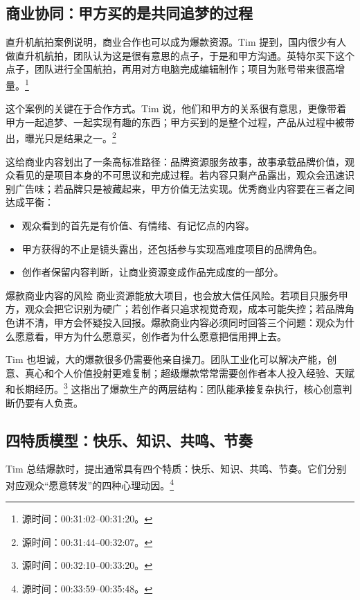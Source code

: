 \documentclass[a4paper]{article}
\begin{document}
\subsection{商业协同：甲方买的是共同追梦的过程}

直升机航拍案例说明，商业合作也可以成为爆款资源。Tim 提到，国内很少有人做直升机航拍，团队认为这是很有意思的点子，于是和甲方沟通。英特尔买下这个点子，团队进行全国航拍，再用对方电脑完成编辑制作；项目为账号带来很高增量。\footnote{源时间：00:31:02--00:31:20。}

这个案例的关键在于合作方式。Tim 说，他们和甲方的关系很有意思，更像带着甲方一起追梦、一起实现有趣的东西；甲方买到的是整个过程，产品从过程中被带出，曝光只是结果之一。\footnote{源时间：00:31:44--00:32:07。}

这给商业内容划出了一条高标准路径：品牌资源服务故事，故事承载品牌价值，观众看见的是项目本身的不可思议和完成过程。若内容只剩产品露出，观众会迅速识别广告味；若品牌只是被藏起来，甲方价值无法实现。优秀商业内容要在三者之间达成平衡：

\begin{itemize}
  \item 观众看到的首先是有价值、有情绪、有记忆点的内容。
  \item 甲方获得的不止是镜头露出，还包括参与实现高难度项目的品牌角色。
  \item 创作者保留内容判断，让商业资源变成作品完成度的一部分。
\end{itemize}

\begin{warningbox}{爆款商业内容的风险}
商业资源能放大项目，也会放大信任风险。若项目只服务甲方，观众会把它识别为硬广；若创作者只追求视觉奇观，成本可能失控；若品牌角色讲不清，甲方会怀疑投入回报。爆款商业内容必须同时回答三个问题：观众为什么愿意看，甲方为什么愿意买，创作者为什么愿意把信用押上去。
\end{warningbox}

Tim 也坦诚，大的爆款很多仍需要他亲自操刀。团队工业化可以解决产能，创意、真心和个人价值投射更难复制；超级爆款常常需要创作者本人投入经验、天赋和长期经历。\footnote{源时间：00:32:10--00:33:20。} 这指出了爆款生产的两层结构：团队能承接复杂执行，核心创意判断仍要有人负责。

\subsection{四特质模型：快乐、知识、共鸣、节奏}

Tim 总结爆款时，提出通常具有四个特质：快乐、知识、共鸣、节奏。它们分别对应观众“愿意转发”的四种心理动因。\footnote{源时间：00:33:59--00:35:48。}
\end{document}

